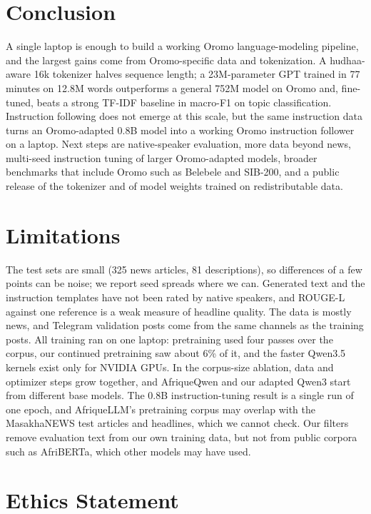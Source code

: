 \documentclass[11pt]{article}
\begin{document}
\section{Conclusion}

A single laptop is enough to build a working Oromo language-modeling pipeline, and the largest gains come from Oromo-specific data and tokenization. A hudhaa-aware 16k tokenizer halves sequence length; a 23M-parameter GPT trained in 77 minutes on 12.8M words outperforms a general 752M model on Oromo and, fine-tuned, beats a strong TF-IDF baseline in macro-F1 on topic classification. Instruction following does not emerge at this scale, but the same instruction data turns an Oromo-adapted 0.8B model into a working Oromo instruction follower on a laptop. Next steps are native-speaker evaluation, more data beyond news, multi-seed instruction tuning of larger Oromo-adapted models, broader benchmarks that include Oromo such as Belebele and SIB-200, and a public release of the tokenizer and of model weights trained on redistributable data.

\section*{Limitations}

The test sets are small (325 news articles, 81 descriptions), so differences of a few points can be noise; we report seed spreads where we can. Generated text and the instruction templates have not been rated by native speakers, and ROUGE-L against one reference is a weak measure of headline quality. The data is mostly news, and Telegram validation posts come from the same channels as the training posts. All training ran on one laptop: pretraining used four passes over the corpus, our continued pretraining saw about 6\% of it, and the faster Qwen3.5 kernels exist only for NVIDIA GPUs. In the corpus-size ablation, data and optimizer steps grow together, and AfriqueQwen and our adapted Qwen3 start from different base models. The 0.8B instruction-tuning result is a single run of one epoch, and AfriqueLLM's pretraining corpus may overlap with the MasakhaNEWS test articles and headlines, which we cannot check. Our filters remove evaluation text from our own training data, but not from public corpora such as AfriBERTa, which other models may have used.

\section*{Ethics Statement}
\end{document}
